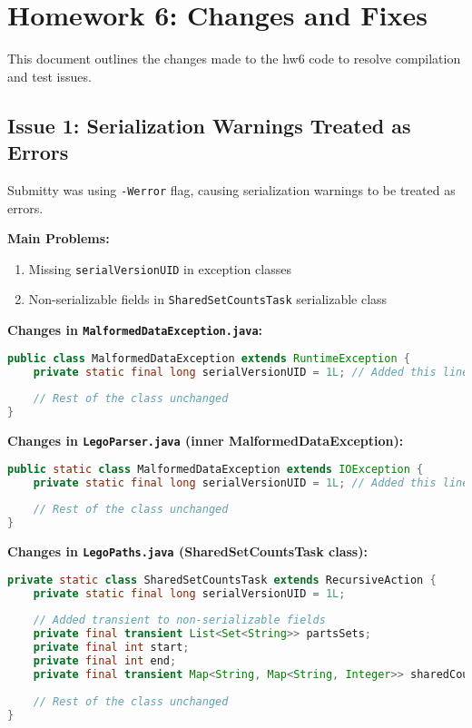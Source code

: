 \documentclass[11pt]{article}
\begin{document}
\section*{Homework 6: Changes and Fixes}

This document outlines the changes made to the hw6 code to resolve compilation and test issues.

\subsection*{Issue 1: Serialization Warnings Treated as Errors}

Submitty was using \texttt{-Werror} flag, causing serialization warnings to be treated as errors.

\textbf{Main Problems:}
\begin{enumerate}
    \item Missing \texttt{serialVersionUID} in exception classes
    \item Non-serializable fields in \texttt{SharedSetCountsTask} serializable class
\end{enumerate}

\textbf{Changes in \texttt{MalformedDataException.java}:}
\begin{lstlisting}[language=Java]
public class MalformedDataException extends RuntimeException {
    private static final long serialVersionUID = 1L; // Added this line
    
    // Rest of the class unchanged
}
\end{lstlisting}

\textbf{Changes in \texttt{LegoParser.java} (inner MalformedDataException):}
\begin{lstlisting}[language=Java]
public static class MalformedDataException extends IOException {
    private static final long serialVersionUID = 1L; // Added this line
    
    // Rest of the class unchanged
}
\end{lstlisting}

\textbf{Changes in \texttt{LegoPaths.java} (SharedSetCountsTask class):}
\begin{lstlisting}[language=Java]
private static class SharedSetCountsTask extends RecursiveAction {
    private static final long serialVersionUID = 1L;
    
    // Added transient to non-serializable fields
    private final transient List<Set<String>> partsSets;
    private final int start;
    private final int end;
    private final transient Map<String, Map<String, Integer>> sharedCounts;
    
    // Rest of the class unchanged
}
\end{lstlisting}
\end{document}
